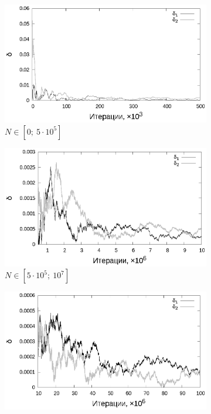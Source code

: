 \documentclass[11pt,a4paper]{article}
\theoremstyle{definition}
\begin{document}
\begin{figure}[h!]
  \begin{subfigure}[b]{0.3\textwidth}
    \includegraphics[width=\textwidth]{figs/classic/linear_log_1x_2_samples_10_variance_1_norm.log_0_500.eps}
    \caption{$N \in [0;~5 \cdot 10^5]$}
    \label{fig:classic_var1_n10_begin}
  \end{subfigure}
  \begin{subfigure}[b]{0.3\textwidth}
    \includegraphics[width=\textwidth]{figs/classic/linear_log_1x_2_samples_10_variance_1_norm.log_500_10000.eps}
    \caption{$N \in [5 \cdot 10^5;~10^7]$}
    \label{fig:classic_var1_n10_middle}
  \end{subfigure}
  \begin{subfigure}[b]{0.3\textwidth}
    \includegraphics[width=\textwidth]{figs/classic/linear_log_1x_2_samples_10_variance_1_norm.log_end.eps}

\end{subfigure}
\end{figure}
\end{document}
